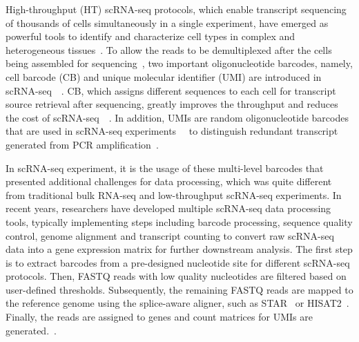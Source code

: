 \documentclass[conference]{IEEEtran}
\begin{document}
High-throughput (HT) scRNA-seq protocols, which enable transcript sequencing of thousands of cells simultaneously in a single experiment, have emerged as powerful tools to identify and characterize cell types in complex and heterogeneous tissues~\cite{Zhang2019ComparativeAO}.
To allow the reads to be demultiplexed after the cells being assembled for sequencing~\cite{Tian2018scPipe}, two important oligonucleotide barcodes, namely, cell barcode (CB) and unique molecular identifier (UMI) are introduced in scRNA-seq~\cite{Rosenberg2018SinglecellPO}~\cite{Cao2017ComprehensiveSC}. 
CB, which assigns different sequences to each cell for transcript source retrieval after sequencing, greatly improves the throughput and reduces the cost of scRNA-seq~\cite{Macosko2015HighlyPG}~\cite{Klein2015DropletBF}. 
In addition, UMIs are random oligonucleotide barcodes that are used in scRNA-seq experiments~\cite{Kivioja2012Counting}~\cite{Camara2017Methods} to distinguish redundant transcript generated from PCR amplification~\cite{Smith2017UMItools}.

In scRNA-seq experiment, it is the usage of these multi-level barcodes that presented additional challenges for data processing, which was quite different from traditional bulk RNA-seq and low-throughput scRNA-seq experiments. 
In recent years, researchers have developed multiple scRNA-seq data processing tools, typically implementing steps including barcode processing, sequence quality control, genome alignment and transcript counting to convert raw scRNA-seq data into a gene expression matrix for further downstream analysis. 
The first step is to extract barcodes from a pre-designed nucleotide site for different scRNA-seq protocols. Then, FASTQ reads with low quality nucleotides are filtered based on user-defined thresholds. 
Subsequently, the remaining FASTQ reads are mapped to the reference genome using the splice-aware aligner, such as STAR~\cite{Dobin2013STAR} or HISAT2~\cite{Kim2015HISAT}. 
Finally, the reads are assigned to genes and count matrices for UMIs are generated.~\cite{Parekh2018zUMIs}. 
\end{document}
